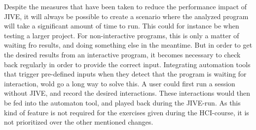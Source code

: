 Despite the measures that have been taken to reduce the performance impact of JIVE, it will always be possible to create a scenario where the analyzed program will take a significant amount of time to run.
This could for instance be when testing a larger project.
For non-interactive programs, this is only a matter of waiting fro results, and doing something else in the meantime.
But in order to get the desired results from an interactive program, it becomes necessary to check back regularly  in order to provide the correct input.
Integrating automation tools that trigger pre-defined  inputs when they detect that the program is waiting for interaction, wold go a long way to solve this.
A user could first run a session without JIVE, and record the desired interactions.
These interactions would then be fed into the automaton tool, and played back during the JIVE-run.
As this kind of feature is not required for the exercises given during the  HCI-course,  it is not prioritized over the other mentioned changes.




